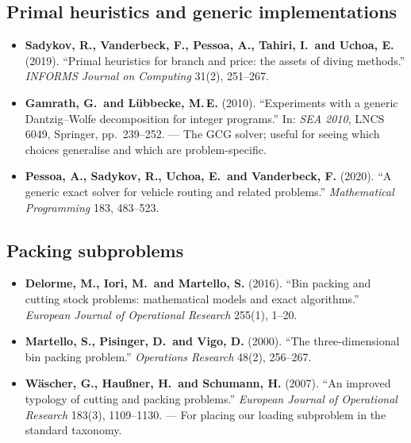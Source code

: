 \documentclass[11pt,a4paper]{article}
\begin{document}
\subsection*{Primal heuristics and generic implementations}

\begin{itemize}[leftmargin=1.4em]
\item \textbf{Sadykov, R., Vanderbeck, F., Pessoa, A., Tahiri, I.\ and Uchoa,
E.} (2019). ``Primal heuristics for branch and price: the assets of diving
methods.'' \emph{INFORMS Journal on Computing} 31(2), 251--267.
\item \textbf{Gamrath, G.\ and L\"ubbecke, M.\,E.} (2010). ``Experiments with a
generic Dantzig--Wolfe decomposition for integer programs.'' In: \emph{SEA
2010}, LNCS 6049, Springer, pp.\ 239--252. --- The GCG solver; useful for seeing
which choices generalise and which are problem-specific.
\item \textbf{Pessoa, A., Sadykov, R., Uchoa, E.\ and Vanderbeck, F.} (2020).
``A generic exact solver for vehicle routing and related problems.''
\emph{Mathematical Programming} 183, 483--523.
\end{itemize}

\subsection*{Packing subproblems}

\begin{itemize}[leftmargin=1.4em]
\item \textbf{Delorme, M., Iori, M.\ and Martello, S.} (2016). ``Bin packing and
cutting stock problems: mathematical models and exact algorithms.''
\emph{European Journal of Operational Research} 255(1), 1--20.
\item \textbf{Martello, S., Pisinger, D.\ and Vigo, D.} (2000). ``The
three-dimensional bin packing problem.'' \emph{Operations Research} 48(2),
256--267.
\item \textbf{W\"ascher, G., Hau{\ss}ner, H.\ and Schumann, H.} (2007). ``An
improved typology of cutting and packing problems.'' \emph{European Journal of
Operational Research} 183(3), 1109--1130. --- For placing our loading
subproblem in the standard taxonomy.
\end{itemize}
\end{document}
